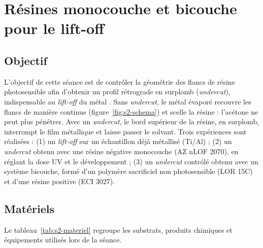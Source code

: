 \section{Résines monocouche et bicouche pour le lift-off}

\subsection{Objectif}
L'objectif de cette séance est de contrôler la géométrie des flancs de résine photosensible afin d'obtenir un profil rétrograde en surplomb (\emph{undercut}), indispensable au \emph{lift-off} du métal \cite{prot2}. Sans \emph{undercut}, le métal évaporé recouvre les flancs de manière continue (figure~\ref{fig:s2-schema}) et scelle la résine : l'acétone ne peut plus pénétrer. Avec un \emph{undercut}, le bord supérieur de la résine, en surplomb, interrompt le film métallique et laisse passer le solvant. Trois expériences sont réalisées : (1) un \emph{lift-off} sur un échantillon déjà métallisé (Ti/Al) ; (2) un \emph{undercut} obtenu avec une résine négative monocouche (AZ nLOF 2070), en réglant la dose UV et le développement ; (3) un \emph{undercut} contrôlé obtenu avec un système bicouche, formé d'un polymère sacrificiel non photosensible (LOR 15C) et d'une résine positive (ECI 3027).

\subsection{Matériels}
Le tableau~\ref{tab:s2-materiel} regroupe les substrats, produits chimiques et équipements utilisés lors de la séance.


